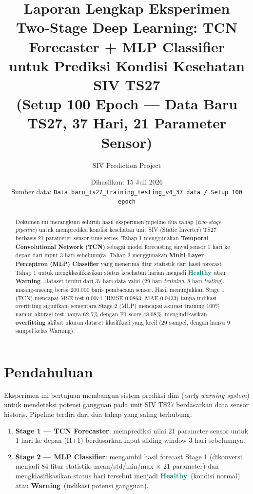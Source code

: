\documentclass[11pt,a4paper]{article}
\title{
    \Large\textbf{Laporan Lengkap Eksperimen}\\
    \large Two-Stage Deep Learning: TCN Forecaster + MLP Classifier\\
    \normalsize untuk Prediksi Kondisi Kesehatan SIV TS27\\[0.3cm]
    \small (Setup 100 Epoch — Data Baru TS27, 37 Hari, 21 Parameter Sensor)
}
\author{SIV Prediction Project}
\date{Dihasilkan: 15 Juli 2026 \\ \small Sumber data: \texttt{Data baru\_ts27\_training\_testing\_v4\_37 data / Setup 100 epoch}}
\newcommand{\healthy}{\textcolor{teal}{\textbf{Healthy}}}
\newcommand{\warning}{\textcolor{orange!80!black}{\textbf{Warning}}}
\begin{document}
\maketitle
\thispagestyle{fancy}

\begin{abstract}
\noindent
Dokumen ini merangkum seluruh hasil eksperimen pipeline dua tahap (\textit{two-stage pipeline}) untuk memprediksi kondisi kesehatan unit SIV (Static Inverter) TS27 berbasis 21 parameter sensor time-series. Tahap 1 menggunakan \textbf{Temporal Convolutional Network (TCN)} sebagai model forecasting sinyal sensor 1 hari ke depan dari input 3 hari sebelumnya. Tahap 2 menggunakan \textbf{Multi-Layer Perceptron (MLP) Classifier} yang menerima fitur statistik dari hasil forecast Tahap 1 untuk mengklasifikasikan status kesehatan harian menjadi \healthy\ atau \warning. Dataset terdiri dari 37 hari data valid (29 hari \textit{training}, 8 hari \textit{testing}), masing-masing berisi 200.000 baris pembacaan sensor. Hasil menunjukkan Stage 1 (TCN) mencapai MSE test 0.0074 (RMSE 0.0863, MAE 0.0433) tanpa indikasi overfitting signifikan, sementara Stage 2 (MLP) mencapai akurasi training 100\% namun akurasi test hanya 62.5\% dengan F1-score 48.08\%, mengindikasikan \textbf{overfitting} akibat ukuran dataset klasifikasi yang kecil (29 sampel, dengan hanya 9 sampel kelas Warning).
\end{abstract}

\tableofcontents
\newpage

\section{Pendahuluan}
Eksperimen ini bertujuan membangun sistem prediksi dini (\textit{early warning system}) untuk mendeteksi potensi gangguan pada unit SIV TS27 berdasarkan data sensor historis. Pipeline terdiri dari dua tahap yang saling terhubung:

\begin{enumerate}
    \item \textbf{Stage 1 — TCN Forecaster}: memprediksi nilai 21 parameter sensor untuk 1 hari ke depan (H+1) berdasarkan input sliding window 3 hari sebelumnya.
    \item \textbf{Stage 2 — MLP Classifier}: mengambil hasil forecast Stage 1 (dikonversi menjadi 84 fitur statistik: mean/std/min/max $\times$ 21 parameter) dan mengklasifikasikan status hari tersebut menjadi \healthy\ (kondisi normal) atau \warning\ (indikasi potensi gangguan).
\end{enumerate}
\end{document}
